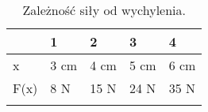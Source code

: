 \begin{table}[htbp]\centering
\begin{tabular}{lllll}
\cline{2-5}
\multicolumn{1}{l|}{}      & \multicolumn{1}{l|}{1}    & \multicolumn{1}{l|}{2}    & \multicolumn{1}{l|}{3}    & \multicolumn{1}{l|}{4}    \\ \hline
\multicolumn{1}{|l|}{x}    & \multicolumn{1}{l|}{3 cm} & \multicolumn{1}{l|}{4 cm} & \multicolumn{1}{l|}{5 cm} & \multicolumn{1}{l|}{6 cm} \\ \hline
\multicolumn{1}{|l|}{F(x)} & \multicolumn{1}{l|}{8 N}  & \multicolumn{1}{l|}{15 N} & \multicolumn{1}{l|}{24 N} & \multicolumn{1}{l|}{35 N} \\ \hline
                           &                           &                           &                           &                       


\end{tabular}
\label{tab:jakub_tabela}
\caption{Zależność siły od wychylenia.}
\end{table}